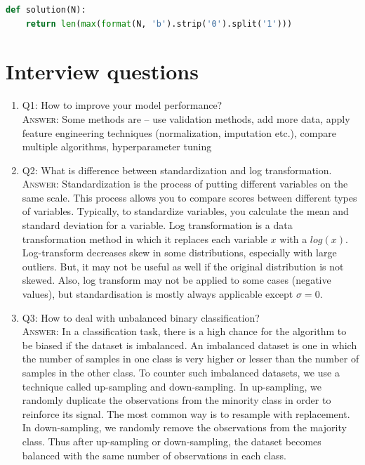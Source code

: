 \documentclass[11pt]{article}
\begin{document}
\begin{mdframed}[backgroundcolor=celadon!6]
\begin{lstlisting}[language=Python]
def solution(N):
    return len(max(format(N, 'b').strip('0').split('1'))) 
\end{lstlisting}
   \end{mdframed} 
   
   
   
   


\section{Interview questions}

\begin{enumerate}

\item Q1: How to improve your model performance?  \\
\textsc{Answer:} Some methods are -- use validation methods, add more data, apply feature engineering techniques (normalization, imputation etc.), compare multiple algorithms, hyperparameter tuning 

\item Q2: What is difference between standardization and log transformation. \\
\textsc{Answer:} Standardization is the process of putting different variables on the same scale. This process allows you to compare scores between different types of variables. Typically, to standardize variables, you calculate the mean and standard deviation for a variable. Log transformation is a data transformation method in which it replaces each variable $x$ with a $log(x)$. Log-transform decreases skew in some distributions, especially with large outliers. But, it may not be useful as well if the original distribution is not skewed. Also, log transform may not be applied to some cases (negative values), but standardisation is mostly always applicable except $\sigma = 0$. 

\item Q3: How to deal with unbalanced binary classification? \\
\textsc{Answer:} In a classification task, there is a high chance for the algorithm to be biased if the dataset is imbalanced. An imbalanced dataset is one in which the number of samples in one class is very higher or lesser than the number of samples in the other class. 
To counter such imbalanced datasets, we use a technique called up-sampling and down-sampling. In up-sampling, we randomly duplicate the observations from the minority class in order to reinforce its signal. The most common way is to resample with replacement. In down-sampling, we randomly remove the observations from the majority class. Thus after up-sampling or down-sampling, the dataset becomes balanced with the same number of observations in each class.

\end{enumerate}
















	
	\newpage
	
	
\end{document}

